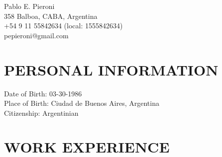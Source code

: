 \documentclass[letterpaper]{article}
\def\name{Pablo E. Pieroni}
\begin{document}
\begin{flushright}
{\huge \name}\\
   358 Balboa, CABA, Argentina\\
   +54 9 11 55842634 (local: 1555842634)\\
   pepieroni@gmail.com
\end{flushright}

\vspace{0.25in}



\section*{PERSONAL INFORMATION}
   Date of Birth: 03-30-1986\\
   Place of Birth: Ciudad de Buenos Aires, Argentina\\
   Citizenship: Argentinian
\section*{WORK EXPERIENCE}
\end{document}
